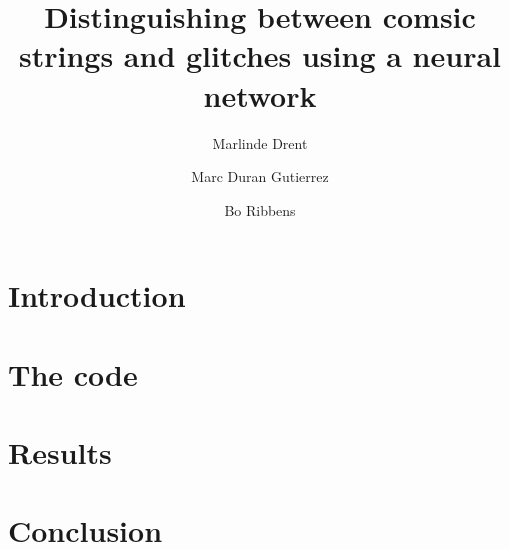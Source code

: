 \documentclass{article} %
\title{\bf{Distinguishing between comsic strings and glitches using a neural network}}
\author[1]{Marlinde Drent}
\author[1]{Marc Duran Gutierrez}
\author[1]{Bo Ribbens}
\affil[1]{\it{Department of Physics, Utrecht University}}
\begin{document}
\maketitle


\section{Introduction}

\section{The code}

\section{Results}

\section{Conclusion}



\end{document}
